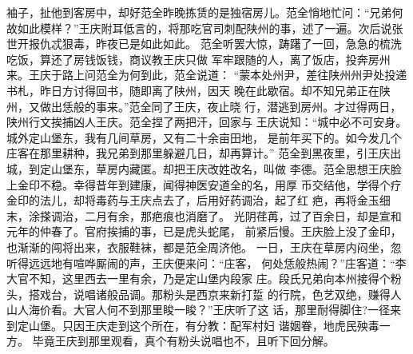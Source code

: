 袖子，扯他到客房中，却好范全昨晚拣赁的是独宿房儿。范全悄地忙问：“兄弟何
故如此模样？”王庆附耳低言的，将那吃官司刺配陕州的事，述了一遍。次后说张
世开报仇忒狠毒，昨夜已是如此如此。
范全听罢大惊，踌躇了一回，急急的梳洗吃饭，算还了房钱饭钱，商议教王庆只做
军牢跟随的人，离了饭店，投奔房州来。王庆于路上问范全为何到此，范全说道：
“蒙本处州尹，差往陕州州尹处投递书札，昨日方讨得回书，随即离了陕州，因天
晚在此歇宿。却不知兄弟正在陕州，又做出恁般的事来。”范全同了王庆，夜止晓
行，潜逃到房州。才过得两日，陕州行文挨捕凶人王庆。范全捏了两把汗，回家与
王庆说知：“城中必不可安身。城外定山堡东，我有几间草房，又有二十余亩田地，
是前年买下的。如今发几个庄客在那里耕种，我兄弟到那里躲避几日，却再算计。”
范全到黑夜里，引王庆出城，到定山堡东，草房内藏匿。却把王庆改姓改名，叫做
李德。范全思想王庆脸上金印不稳。幸得昔年到建康，闻得神医安道全的名，用厚
币交结他，学得个疗金印的法儿，却将毒药与王庆点去了，后用好药调治，起了红
疤，再将金玉细末，涂搽调治，二月有余，那疤痕也消磨了。
光阴荏苒，过了百余日，却是宣和元年的仲春了。官府挨捕的事，已是虎头蛇尾，
前紧后慢。王庆脸上没了金印，也渐渐的闯将出来，衣服鞋袜，都是范全周济他。
一日，王庆在草房内闷坐，忽听得远远地有喧哗厮闹的声，王庆便来问：“庄客，
何处恁般热闹？”庄客道：“李大官不知，这里西去一里有余，乃是定山堡内段家
庄。段氏兄弟向本州接得个粉头，搭戏台，说唱诸般品调。那粉头是西京来新打踅
的行院，色艺双绝，赚得人山人海价看。大官人何不到那里睃一睃？”王庆听了这
话，那里耐得脚住?一径来到定山堡。只因王庆走到这个所在，有分教：配军村妇
谐姻眷，地虎民殃毒一方。
毕竟王庆到那里观看，真个有粉头说唱也不，且听下回分解。